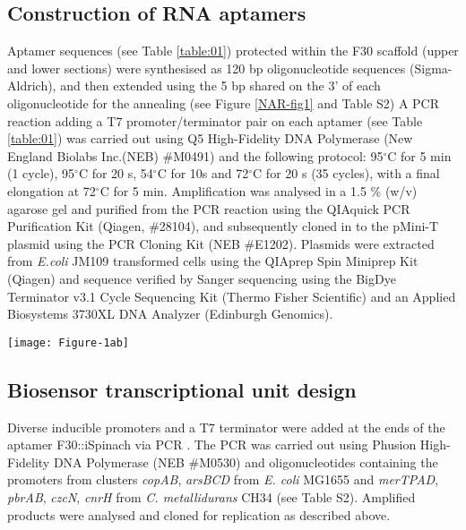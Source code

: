 \subsection*{Construction of RNA aptamers}

Aptamer sequences (see Table \ref{table:01}) protected within the F30 scaffold (upper and lower sections) were synthesised as 120 bp oligonucleotide sequences (Sigma-Aldrich), and then extended using the 5 bp shared on the 3' of each oligonucleotide for the annealing (see Figure \ref{NAR-fig1} and Table S2)
A PCR reaction adding a T7 promoter/terminator pair on each aptamer (see Table \ref{table:01}) was carried out using Q5 High-Fidelity DNA Polymerase (New England Biolabs Inc.(NEB) \#M0491) and the following protocol: 95$^{\circ}$C for 5 min (1 cycle), 95$^{\circ}$C for 20 s, 54$^{\circ}$C for 10s and 72$^{\circ}$C for 20 s (35 cycles), with a final elongation at 72$^{\circ}$C for 5 min. Amplification was analysed in a 1.5 \% (w/v) agarose gel and purified from the PCR reaction using the QIAquick PCR Purification Kit (Qiagen, \#28104), and subsequently cloned in to the pMini-T plasmid using the PCR Cloning Kit (NEB \#E1202). 
Plasmids were extracted from \textit{E.coli} JM109 transformed cells using the QIAprep Spin Miniprep Kit (Qiagen) and sequence verified by Sanger sequencing using the BigDye Terminator v3.1 Cycle Sequencing Kit (Thermo Fisher Scientific) and an Applied Biosystems 3730XL DNA Analyzer (Edinburgh Genomics).

\begin{figure*}[h]
\begin{center}
\hspace*{0cm}
\texttt{[image: Figure-1ab]}
\end{center}
\caption{Schematic diagrams of TXO cell free system with minimal requirements. \textbf{(a)} Sequence and production process of diverse RNA aptamers via PCR, showing addition of BsmBI sites for further Golden Gate manipulation. \textbf{(b)} In a TXO system there are minimal requirements such as an inducer, moderator/repressor, RNA polymerase and a final RNA output herewith represented as a fluorescent aptamer.}
\label{NAR-fig1}
\end{figure*}

\subsection*{Biosensor transcriptional unit design}
Diverse inducible promoters and a T7 terminator were added at the ends of the aptamer F30::iSpinach via PCR \cite{13}. The PCR was carried out using Phusion High-Fidelity DNA Polymerase (NEB \#M0530) and oligonucleotides containing the promoters from clusters \textit{copAB}, \textit{arsBCD} from \textit{E. coli} MG1655 and \textit{merTPAD}, \textit{pbrAB}, \textit{czcN}, \textit{cnrH} from \textit{C. metallidurans} CH34 (see Table S2). Amplified products were analysed and cloned for replication as described above.

